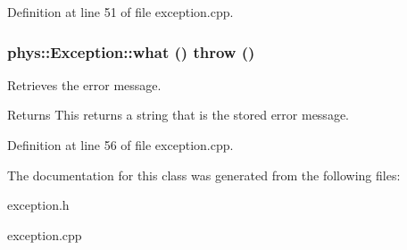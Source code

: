 Definition at line 51 of file exception.cpp.

\hypertarget{classphys_1_1Exception_ac929f9b3929526eec6e6b581c9a9dd73}{
\subsubsection[{what}]{ phys::Exception::what ()  throw ()}}
\label{dc/d47/classphys_1_1Exception_ac929f9b3929526eec6e6b581c9a9dd73}


Retrieves the error message. 

\begin{DoxyReturn}{Returns}
This returns a string that is the stored error message. 
\end{DoxyReturn}


Definition at line 56 of file exception.cpp.



The documentation for this class was generated from the following files:\begin{DoxyCompactItemize}
\item 
exception.h\item 
exception.cpp\end{DoxyCompactItemize}
